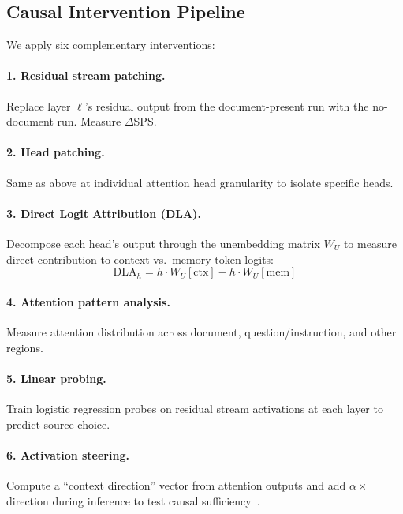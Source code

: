 \documentclass{article}
\begin{document}
\subsection{Causal Intervention Pipeline}

We apply six complementary interventions:

\paragraph{1. Residual stream patching.} Replace layer $\ell$'s residual output from the document-present run with the no-document run. Measure $\Delta$SPS.

\paragraph{2. Head patching.} Same as above at individual attention head granularity to isolate specific heads.

\paragraph{3. Direct Logit Attribution (DLA).} Decompose each head's output through the unembedding matrix $W_U$ to measure direct contribution to context vs.\ memory token logits:
\begin{equation}
\text{DLA}_h = h \cdot W_U[\text{ctx}] - h \cdot W_U[\text{mem}]
\end{equation}

\paragraph{4. Attention pattern analysis.} Measure attention distribution across document, question/instruction, and other regions.

\paragraph{5. Linear probing.} Train logistic regression probes on residual stream activations at each layer to predict source choice.

\paragraph{6. Activation steering.} Compute a ``context direction'' vector from attention outputs and add $\alpha \times$ direction during inference to test causal sufficiency~\citep{turner2024activation}.
\end{document}
